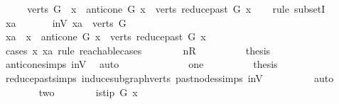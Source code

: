 \begin{isabellebody}
%
\isadelimproof
%
\endisadelimproof
%
\isatagproof
{}\isamarkupfalse%
\ \isanewline
\ \ \isamarkupfalse%
\ {\isachardoublequoteopen}verts\ G\ {\isasymsubseteq}\ {\isacharbraceleft}{\kern0pt}x{\isacharbraceright}{\kern0pt}\ {\isasymunion}\ anticone\ G\ x\ {\isasymunion}\ verts\ {\isacharparenleft}{\kern0pt}reduce{\isacharunderscore}{\kern0pt}past\ G\ x{\isacharparenright}{\kern0pt}{\isachardoublequoteclose}\ \isanewline
\ \ \isamarkupfalse%
{\isacharparenleft}{\kern0pt}rule\ subsetI{\isacharparenright}{\kern0pt}\isanewline
\ \ \ \ \isamarkupfalse%
\ xa\ \isanewline
\ \ \ \ \isamarkupfalse%
\ in{\isacharunderscore}{\kern0pt}V{\isacharcolon}{\kern0pt}\ {\isachardoublequoteopen}xa\ {\isasymin}\ verts\ G{\isachardoublequoteclose}\isanewline
\ \ \ \ \isamarkupfalse%
\ \isamarkupfalse%
\ {\isachardoublequoteopen}xa\ {\isasymin}\ {\isacharbraceleft}{\kern0pt}x{\isacharbraceright}{\kern0pt}\ {\isasymunion}\ anticone\ G\ x\ {\isasymunion}\ verts\ {\isacharparenleft}{\kern0pt}reduce{\isacharunderscore}{\kern0pt}past\ G\ x{\isacharparenright}{\kern0pt}{\isachardoublequoteclose}\isanewline
\ \ \ \ \isamarkupfalse%
{\isacharparenleft}{\kern0pt}\ cases\ x\ xa\ rule{\isacharcolon}{\kern0pt}\ reachable{}{\isacharunderscore}{\kern0pt}cases{\isacharparenright}{\kern0pt}\isanewline
\ \ \ \ \ \ \isamarkupfalse%
\ nR\isanewline
\ \ \ \ \ \ \isamarkupfalse%
\ \isamarkupfalse%
\ {\isacharquery}{\kern0pt}thesis\ \isamarkupfalse%
\ anticone{\isachardot}{\kern0pt}simps\ in{\isacharunderscore}{\kern0pt}V\ \isamarkupfalse%
\ auto\ \isanewline
\ \ \ \ \isamarkupfalse%
\isanewline
\ \ \ \ \ \ \isamarkupfalse%
\ one\isanewline
\ \ \ \ \ \ \isamarkupfalse%
\ \isamarkupfalse%
\ {\isacharquery}{\kern0pt}thesis\ \isamarkupfalse%
\ reduce{\isacharunderscore}{\kern0pt}past{\isachardot}{\kern0pt}simps\ induce{\isacharunderscore}{\kern0pt}subgraph{\isacharunderscore}{\kern0pt}verts\ past{\isacharunderscore}{\kern0pt}nodes{\isachardot}{\kern0pt}simps\ in{\isacharunderscore}{\kern0pt}V\isanewline
\ \ \ \ \ \ \ \ \isamarkupfalse%
\ auto\isanewline
\ \ \ \ \isamarkupfalse%
\isanewline
\ \ \ \ \ \ \isamarkupfalse%
\ two\isanewline
\ \ \ \ \ \ \isamarkupfalse%
\ {\isachardoublequoteopen}is{\isacharunderscore}{\kern0pt}tip\ G\ x{\isachardoublequoteclose}\ \isamarkupfalse%

\end{isabellebody}
